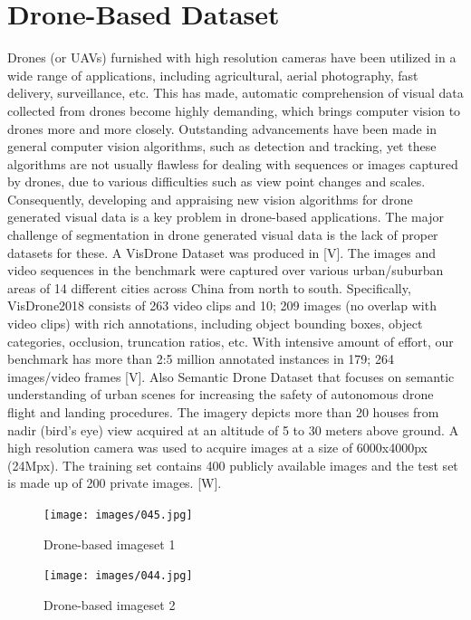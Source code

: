 \section{Drone-Based Dataset }
Drones (or UAVs) furnished with high resolution cameras have been utilized in a wide range of applications, including agricultural, aerial photography, fast delivery, surveillance, etc. This has made, automatic comprehension of visual data collected from drones become highly demanding, which brings computer vision to drones more and more closely. Outstanding advancements have been made in general computer vision algorithms, such as detection and tracking, yet these algorithms are not usually flawless for dealing with sequences or images captured by drones, due to various difficulties such as view point changes and scales. Consequently, developing and appraising new vision algorithms for drone generated visual data is a key problem in drone-based applications.
The major challenge of segmentation in drone generated visual data is the lack of proper datasets for these. A VisDrone Dataset was produced in [V]. The images and video sequences in the benchmark were captured over various urban/suburban areas of 14 different cities across China from north to south. Specifically, VisDrone2018 consists of 263 video clips and 10; 209 images (no overlap with video clips) with rich annotations, including object bounding boxes, object categories, occlusion, truncation ratios, etc. With intensive amount of effort, our benchmark has more than 2:5 million annotated instances in 179; 264 images/video frames [V]. Also Semantic Drone Dataset that focuses on semantic understanding of urban scenes for increasing the safety of autonomous drone flight and landing procedures. The imagery depicts more than 20 houses from nadir (bird's eye) view acquired at an altitude of 5 to 30 meters above ground. A high resolution camera was used to acquire images at a size of 6000x4000px (24Mpx). The training set contains 400 publicly available images and the test set is made up of 200 private images. [W].

\begin{figure}[H]
  \centering
  
    \texttt{[image: images/045.jpg]}
    \caption{Drone-based imageset 1}
    \label{image 1}
  \end{figure}
  
  \begin{figure}[H]
    \centering
    \texttt{[image: images/044.jpg]}
    \caption{Drone-based imageset 2}
    \label{image 2}
\end{figure}